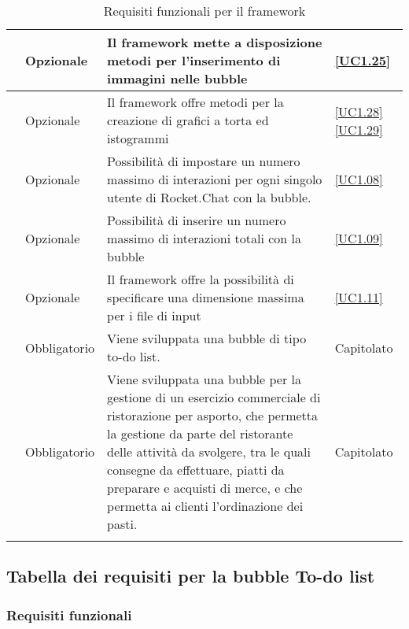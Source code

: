 \begin{longtable}{|P{1.5cm}|P{2.5cm}|P{6.5cm}|P{2.5cm}|}
	\hline \RequisitoOpF\label{L45} & Opzionale & Il framework mette a disposizione metodi per l'inserimento di immagini nelle bubble
	 & \ref{UC1.25} \\
	\hline \RequisitoOpF\label{L46} & Opzionale & Il framework offre metodi per la creazione di grafici a torta ed istogrammi
	 & \ref{UC1.28} \linebreak \ref{UC1.29}  \\	 
	 \hline \RequisitoOpF\label{L47} & Opzionale & Possibilità di impostare un numero massimo di interazioni per ogni singolo utente di Rocket.Chat con la bubble. & \ref{UC1.08} \\
	 \hline \RequisitoOpF\label{L48} & Opzionale & Possibilità di inserire un numero massimo di interazioni totali con la bubble & \ref{UC1.09} \\
	 \hline \RequisitoOpF\label{L49} & Opzionale & Il framework offre la possibilità di specificare una dimensione massima per i file di input & \ref{UC1.11} \\
	 \hline \RequisitoOpF\label{L3} & Obbligatorio & Viene sviluppata una bubble di tipo to-do list. & Capitolato \\
	 \hline \RequisitoOpF\label{L4} & Obbligatorio & Viene sviluppata una bubble per la gestione di un esercizio commerciale di ristorazione per asporto, che permetta la gestione da parte del ristorante delle attività da svolgere, tra le quali consegne da effettuare, piatti da preparare e acquisti di merce, e che permetta ai clienti l'ordinazione dei pasti. & Capitolato \\
	\hline
	\caption{Requisiti funzionali per il framework}
\end{longtable}


\subsection{Tabella dei requisiti per la bubble To-do list}

\subsubsection{Requisiti funzionali}

